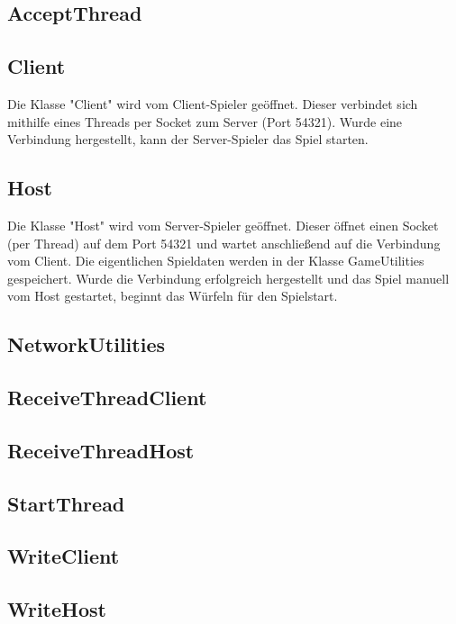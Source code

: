\documentclass[11pt]{article} %
\begin{document}
\subsection{AcceptThread}

\subsection{Client}
Die Klasse "Client" wird vom Client-Spieler geöffnet. Dieser verbindet sich mithilfe eines Threads per Socket zum Server (Port 54321). Wurde eine Verbindung hergestellt, kann der Server-Spieler das Spiel starten.

\subsection{Host}
Die Klasse "Host" wird vom Server-Spieler geöffnet. Dieser öffnet einen Socket (per Thread) auf dem Port 54321 und wartet anschließend auf die Verbindung vom Client. Die eigentlichen Spieldaten werden in der Klasse GameUtilities gespeichert.
Wurde die Verbindung erfolgreich hergestellt und das Spiel manuell vom Host gestartet, beginnt das Würfeln für den Spielstart.

\subsection{NetworkUtilities}

\subsection{ReceiveThreadClient}

\subsection{ReceiveThreadHost}

\subsection{StartThread}

\subsection{WriteClient}

\subsection{WriteHost}
\end{document}
